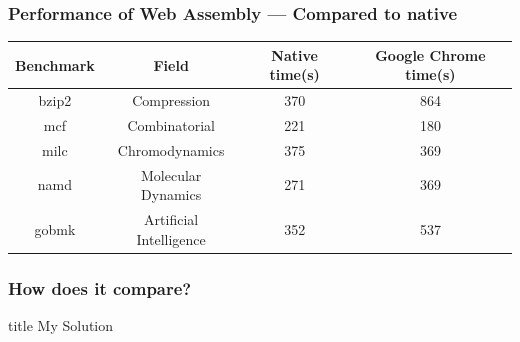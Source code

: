 \documentclass{beamer}
\begin{document}
\begin{frame}
    \frametitle{Performance of Web Assembly — Compared to native}

    {\small
        \begin{table}[H]
            \centering
            \vspace*{6pt}
            \label{native}
            \begin{tabular}{cccc}\hline\hline
                Benchmark & Field                   & Native time(s) & Google Chrome time(s) \\ \hline
                bzip2     & Compression             & 370            & 864                   \\
                mcf       & Combinatorial           & 221            & 180                   \\
                milc      & Chromodynamics          & 375            & 369                   \\
                namd      & Molecular Dynamics      & 271            & 369                   \\
                gobmk     & Artificial Intelligence & 352            & 537
            \end{tabular}
        \end{table}
    }
\end{frame}

\begin{frame}
    \frametitle{How does it compare?}
\end{frame}

\begin{frame}
    \vfill
    \centering
    \begin{beamercolorbox}[sep=8pt,center,shadow=true,rounded=true]{title}
         My Solution\par%
    \end{beamercolorbox}
    \vfill
\end{frame}
\end{document}
